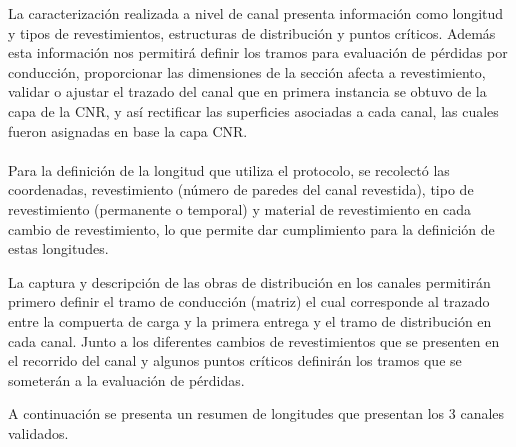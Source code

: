 \documentclass[]{article}
\begin{document}
La caracterización realizada a nivel de canal presenta información como longitud y tipos de revestimientos, estructuras de distribución y puntos críticos. Además esta información nos permitirá definir los tramos para evaluación de pérdidas por conducción, proporcionar las dimensiones de la sección afecta a revestimiento, validar o ajustar el trazado del canal que en primera instancia se obtuvo de la capa de la CNR, y así rectificar las superficies asociadas a cada canal, las cuales fueron asignadas en base la capa CNR.\\
\\ 
Para la definición de la longitud que utiliza el protocolo, se recolectó las coordenadas, revestimiento (número de paredes del canal revestida), tipo de revestimiento (permanente o temporal) y material de revestimiento en cada cambio de revestimiento, lo que permite dar cumplimiento para la definición de estas longitudes.

La captura y descripción de las obras de distribución en los canales permitirán primero definir el tramo de conducción (matriz) el cual corresponde al trazado entre la compuerta de carga y la primera entrega y el tramo de distribución en cada canal. Junto a los diferentes cambios de revestimientos que se presenten en el recorrido del canal y algunos puntos críticos definirán los tramos que se someterán a la evaluación de pérdidas. 

A continuación se presenta un resumen de longitudes que presentan los 3 canales validados.

\begin{table}[H]
\centering
\caption{Longitudes por canal}
\label{my-label}
\end{table}
\end{document}

